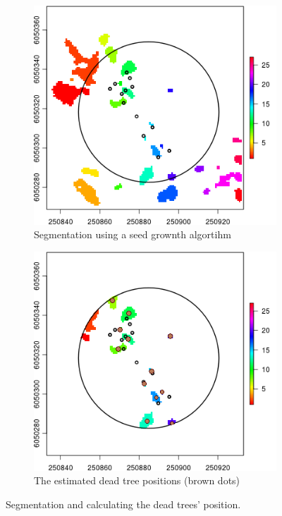 \documentclass{subfiles}
\begin{document}
  \begin{figure} [h!]			
  	\begin{subfigure}[t]{.49\textwidth}
  		\centering
  		\includegraphics[width=\textwidth]{img/dead/c10_segmentationResults}
  		\caption{Segmentation using a seed grownth algortihm}
  		\label{fig:c10_segmentation}
  	\end{subfigure}
  	\begin{subfigure}[t]{.49\textwidth}
  		\centering
  		\includegraphics[width=\textwidth]{img/dead/c11_TreePos}
  		\caption{The estimated dead tree positions (brown dots)} 
  		\label{fig:c11_results}
  	\end{subfigure}
  	\caption{Segmentation and calculating the dead trees' position. }  
  	\label{fig:segm_results} 
  \end{figure}
  
\end{document}
